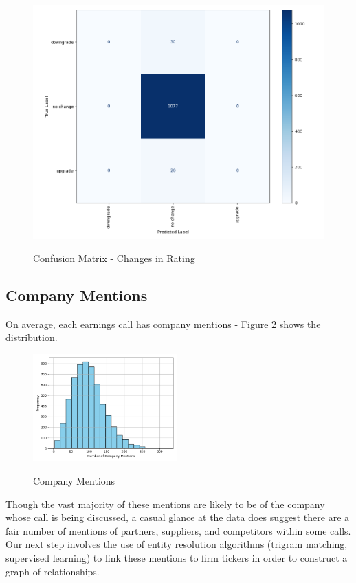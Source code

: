 \documentclass{article}[11pt]
\begin{document}
    \begin{figure}[h!]
		\centering
        \caption{Confusion Matrix - Changes in Rating}
        \includegraphics[width=0.6\linewidth,keepaspectratio=true]{../Output/Modelling/Logistic Regression/change_model/change_model_confusion_matrix_no_title.png}
        \label{fig:change-confusion-matrix}
	\end{figure}

    \clearpage
    \newpage

    \subsection{Company Mentions}

    \label{sec:company-mentions}

    On average, each earnings call has \avgCompanyMentions \space company mentions - Figure \ref{fig:company-mentions} shows the distribution.

    \begin{figure}[h!]
		\centering
        \caption{Company Mentions}
        \includegraphics[width=0.4925\textwidth,keepaspectratio=true]{../Output/All Data EDA/NLP EDA - NER on Company Names/Company Mentions Distribution No Title.png}
        \label{fig:company-mentions}
	\end{figure}

    Though the vast majority of these mentions are likely to be of the company whose call is being discussed, a casual glance at the data does suggest there are a fair number of mentions of partners, suppliers, and competitors within some calls. Our next step involves the use of entity resolution algorithms (trigram matching, supervised learning) to link these mentions to firm tickers in order to construct a graph of relationships.
\end{document}

